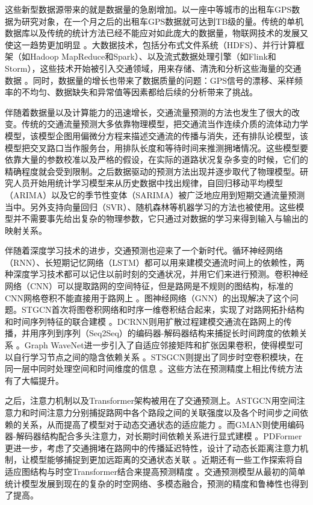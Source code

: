 这些新型数据源带来的就是数据量的急剧增加。以一座中等城市的出租车GPS数据为研究对象，在一个月之后的出租车GPS数据就可达到TB级的量。传统的单机数据库以及传统的统计方法已经不能应对如此庞大的数据量，物联网技术的发展又使这一趋势更加明显 。大数据技术，包括分布式文件系统（HDFS）、并行计算框架（如Hadoop MapReduce和Spark）、以及流式数据处理引擎（如Flink和Storm），这些技术开始被引入交通领域，用来存储、清洗和分析这些海量的交通数据 。同时，数据量的增长也带来了数据质量的问题：GPS信号的漂移、采样频率的不均匀、数据缺失和异常值等因素都给后续的分析带来了挑战。

伴随着数据量以及计算能力的迅速增长，交通流量预测的方法也发生了很大的改变。传统的交通流量预测大多依靠物理模型，把交通流当作连续介质的流体动力学模型，该模型企图用偏微分方程来描述交通流的传播与消失，还有排队论模型，该模型把交叉路口当作服务台，用排队长度和等待时间来推测拥堵情况。这些模型要依靠大量的参数校准以及严格的假设，在实际的道路状况复杂多变的时候，它们的精确程度就会受到限制。之后数据驱动的预测方法出现并逐步取代了物理模型。研究人员开始用统计学习模型来从历史数据中找出规律，自回归移动平均模型（ARIMA）以及它的季节性变体（SARIMA）被广泛地应用到短期交通流量预测当中。另外支持向量回归（SVR）、随机森林等机器学习的方法也被使用。这些模型并不需要事先给出复杂的物理参数，它只通过对数据的学习来得到输入与输出的映射关系。

伴随着深度学习技术的进步，交通预测也迎来了一个新时代。循环神经网络（RNN）、长短期记忆网络（LSTM）都可以用来建模交通流时间上的依赖性，两种深度学习技术都可以记住以前时刻的交通状况，并用它们来进行预测。卷积神经网络（CNN）可以提取路网的空间特征，但是路网是不规则的图结构，标准的CNN网格卷积不能直接用于路网上 。图神经网络（GNN）的出现解决了这个问题。STGCN首次将图卷积网络和时序一维卷积结合起来，实现了对路网拓扑结构和时间序列特征的联合建模 。DCRNN则用扩散过程建模交通流在路网上的传播，并用序列到序列（Seq2Seq）的编码器-解码器结构来捕捉长时间跨度的依赖关系 。Graph WaveNet进一步引入了自适应邻接矩阵和扩张因果卷积，使得模型可以自行学习节点之间的隐含依赖关系 。STSGCN则提出了同步时空卷积模块，在同一层中同时处理空间和时间维度的信息 。这些方法在预测精度上相比传统方法有了大幅提升。

之后，注意力机制以及Transformer架构被用在了交通预测上。ASTGCN用空间注意力和时间注意力分别捕捉路网中各个路段之间的关联强度以及各个时间步之间依赖的关系，从而提高了模型对于动态交通状态的适应能力 。而GMAN则使用编码器-解码器结构配合多头注意力，对长期时间依赖关系进行显式建模 。PDFormer更进一步，考虑了交通拥堵在路网中的传播延迟特性，设计了动态长距离注意力机制，让模型能够捕捉到更加远距离的交通状态关联 。近期还有一些工作探索将自适应图结构与时空Transformer结合来提高预测精度 。交通预测模型从最初的简单统计模型发展到现在的复杂的时空网络、多模态融合，预测的精度和鲁棒性也得到了提高。

